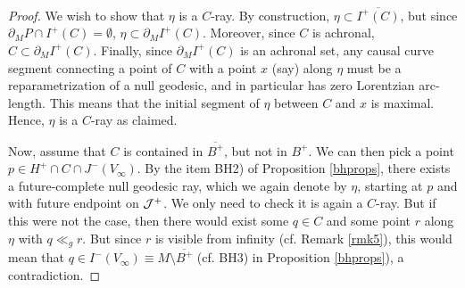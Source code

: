 \begin{proof}
We wish to show that $\eta$ is a $C$-ray. By construction, $\eta \subset \overline{I^+(C)}$, but since $\partial_{M} P \cap I^+(C) = \emptyset$, $\eta \subset \partial_{M} I^+(C)$. Moreover, since $C$ is achronal, $C \subset \partial_{M} I^+(C)$. Finally, since  $\partial_{M} I^+(C)$ is an achronal set, any causal curve segment connecting a point of $C$ with a point $x$ (say) along $\eta$ must be a reparametrization of a null geodesic, and in particular has zero Lorentzian arc-length. This means that the initial segment of $\eta$ between $C$ and $x$ is maximal. Hence, $\eta$ is a $C$-ray as claimed.

Now, assume that $C$ is contained in $\overline{B^+}$, but not in $B^+$. We can then pick a point $p \in H^+\cap C\cap J^-(V_{\infty})$. By the item BH2) of Proposition \ref{bhprops}, there exists a future-complete null geodesic ray, which we again denote by $\eta$, starting at $p$ and with future endpoint on ${\cal J}^+$. We only need to check it is again a $C$-ray. But if this were not the case, then there would exist some $q \in C$ and some point $r$ along $\eta$ with $q \ll_g r$. But since $r$ is visible from infinity (cf. Remark \ref{rmk5}), this would mean that $q \in I^-(V_{\infty}) \equiv M\setminus \overline{B^+}$ (cf. BH3) in Proposition \ref{bhprops}), a contradiction.
\end{proof}




